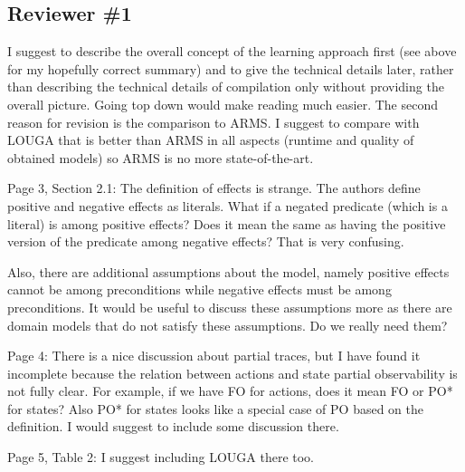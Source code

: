 \documentclass{article}
\begin{document}
\subsection*{Reviewer \#1}

\vspace*{.3cm}

\begin{mdframed}[hidealllines=true,backgroundcolor=gray!20]
I suggest to describe the overall concept of the learning approach first (see above for my hopefully correct summary) and to give the technical details later, rather than describing the technical details of compilation only without providing the overall picture. Going top down would make reading much easier. The second reason for revision is the comparison to ARMS. I suggest to compare with LOUGA that is better than ARMS in all aspects (runtime and quality of obtained models) so ARMS is no more state-of-the-art.
\end{mdframed}

\begin{mdframed}[hidealllines=true,backgroundcolor=gray!20]
 Page 3, Section 2.1: The definition of effects is strange. The authors define positive and negative effects as literals. What if a negated predicate (which is a literal) is among positive effects? Does it mean the same as having the positive version of the predicate among negative effects? That is very confusing.

Also, there are additional assumptions about the model, namely positive effects cannot be among preconditions while negative effects must be among preconditions. It would be useful to discuss these assumptions more as there are domain models that do not satisfy these assumptions. Do we really need them? 
\end{mdframed}

\begin{mdframed}[hidealllines=true,backgroundcolor=gray!20]
  Page 4: There is a nice discussion about partial traces, but I have found it incomplete because the relation between actions and state partial observability is not fully clear. For example, if we have FO for actions, does it mean FO or PO* for states? Also PO* for states looks like a special case of PO based on the definition. I would suggest to include some discussion there.
\end{mdframed}


\begin{mdframed}[hidealllines=true,backgroundcolor=gray!20]
  Page 5, Table 2: I suggest including LOUGA there too.
\end{mdframed}
\end{document}
